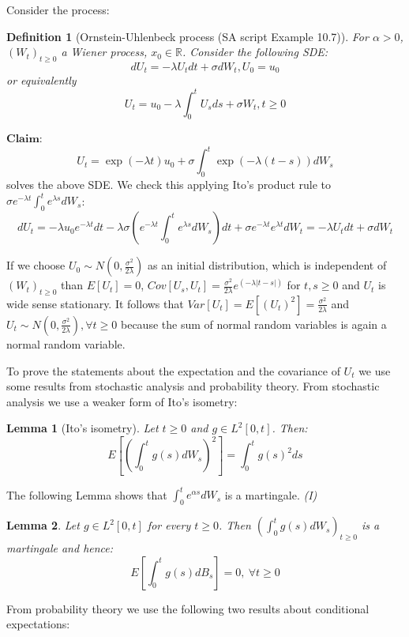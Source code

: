 \documentclass[%
thesis=student,%
coverpage=false,%
titlepage=false,%
headmarks=true, %
english,%
font=libertine, %
math=newpxtx, %
BCOR=5mm,%
coverBCOR=11mm%
]{tumbook}
\newtheorem{definition}{Definition}[section]
\newtheorem{lemma}{Lemma}
\begin{document}
Consider the process:

\begin{definition}[Ornstein-Uhlenbeck process (SA script Example 10.7)] 
For $\alpha > 0$, $(W_{t})_{t\geq 0}$ a Wiener process, $x_{0} \in \mathbb{R}$. Consider the following SDE:
\[
dU_{t} = -\lambda U_{t} dt + \sigma dW_{t}, U_{0} = u_{0}
\]
\label{def:OU process}
or equivalently
\[
U_{t} = u_{0} - \lambda\int_{0}^{t}U_{s}ds + \sigma W_{t}, t \geq 0
\]  
\end{definition}

$\textbf{Claim}$: 
\[
U_{t} = \exp(-\lambda t)u_{0} + \sigma\int_{0}^{t}\exp(-\lambda (t-s))dW_{s}
\]
solves the above SDE. We check this applying Ito's product rule to $\sigma e^{-\lambda t}\int_{0}^{t}e^{\lambda s}dW_{s}$:
\[
dU_{t} = -\lambda u_{0}e^{-\lambda t}dt - \lambda\sigma(e^{-\lambda t}\int_{0}^{t}e^{\lambda s}dW_{s})dt + \sigma e^{-\lambda t}e^{\lambda t}dW_{t} = -\lambda U_{t} dt + \sigma dW_{t}
\]

If we choose $U_{0} \sim N(0,\frac{\sigma^{2}}{2\lambda})$ as an initial distribution, which is independent of $(W_{t})_{t\geq 0}$ than $E[U_{t}] = 0$, $Cov[U_{s},U_{t}] = \frac{\sigma^2}{2\lambda}e^{(-\lambda\lvert t-s \rvert)}$ for $t,s \geq 0$ and $U_{t}$ is wide sense stationary. It follows that $Var[U_{t}]=E[(U_{t})^{2}]=\frac{\sigma^2}{2\lambda}$ and $U_{t} \sim N(0,\frac{\sigma^2}{2\lambda}), \forall t \geq 0$ because the sum of normal random variables is again a normal random variable.

To prove the statements about the expectation and the covariance of $U_{t}$ we use some results from stochastic analysis and probability theory.
From stochastic analysis we use a weaker form of Ito's isometry:

\begin{lemma}[Ito's isometry]
 Let $t \geq 0$ and $g \in L^2[0,t]$. Then:
 \[
 E[(\int_{0}^{t}g(s)dW_{s})^{2}] = \int_{0}^{t}g(s)^2ds
 \]
\end{lemma}

The following Lemma shows that $\int_{0}^{t}e^{\alpha s}dW_{s}$ is a martingale.   \textit{(I)}

\begin{lemma}
    Let $g \in L^2[0,t]$ for every $t \geq 0$. Then $(\int_{0}^{t}g(s)dW_{s})_{t\geq 0}$ is a martingale and hence:
    \[
    E[\int_{0}^{t}g(s)dB_{s}] = 0, \ \forall t \geq 0
    \]
\end{lemma}

From probability theory we use the following two results about conditional expectations:
\end{document}
